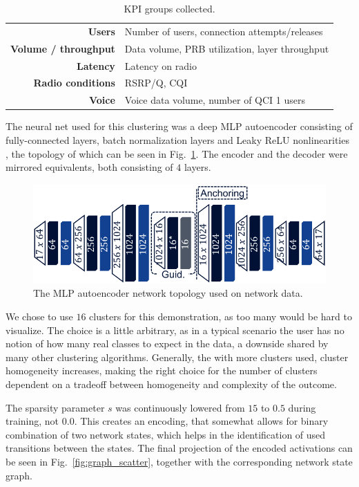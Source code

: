 			\begin{table}[t]
				\centering
				\renewcommand*{\arraystretch}{1.2}
				\begin{tabular}{r|l}					
					\textbf{Users}					&Number of users, connection attempts/releases		\\
					\textbf{Volume / throughput}	&Data volume, PRB utilization, layer throughput		\\
					\textbf{Latency}				&Latency on radio									\\
					\textbf{Radio conditions}		&RSRP/Q, CQI										\\
					\textbf{Voice}					&Voice data volume, number of QCI 1 users
				\end{tabular}
				\caption[KPI groups collected for the SCA evaluation]{KPI groups collected.}
				\label{tab:kpigroups}
			\end{table}		
			
			The neural net used for this clustering was a deep \ac{MLP} autoencoder consisting of fully-connected layers, batch normalization layers and Leaky \ac{ReLU} nonlinearities \cite{maas2013rectifier}, the topology of which can be seen in Fig.~\ref{fig:topology_mlp}.
			The encoder and the decoder were mirrored equivalents, both consisting of $4$ layers.
			
			\begin{figure}[ht]
				\centering
				\includegraphics[width=0.5\linewidth]{figures/06_sparse_clust/topology_mlp/topology_mlp.pdf}
				\caption[MLP AE topology used for network data in the SCA evaluation]{The MLP autoencoder network topology used on network data.}
				\label{fig:topology_mlp}
			\end{figure}	
			
			We chose to use $16$ clusters for this demonstration, as too many would be hard to visualize.
			The choice is a little arbitrary, as in a typical scenario the user has no notion of how many real classes to expect in the data, a downside shared by many other clustering algorithms.
			Generally, the with more clusters used, cluster homogeneity increases, making the right choice for the number of clusters dependent on a tradeoff between homogeneity and complexity of the outcome.
			
			The sparsity parameter $s$ was continuously lowered from $15$ to $0.5$ during training, not $0.0$.
			This creates an encoding, that somewhat allows for binary combination of two network states, which helps in the identification of used transitions between the states. The final projection of the encoded activations can be seen in Fig.~\ref{fig:graph_scatter}, together with the corresponding network state graph.
			
